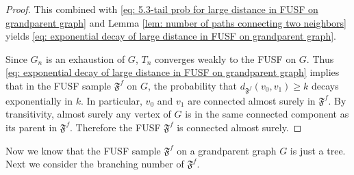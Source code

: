 \documentclass[12pt]{article}
\numberwithin{equation}{section}
\newcommand{\1}{\mathbf{1}}
\begin{document}
\begin{proof}
	This combined with \eqref{eq: 5.3-tail prob for large distance in FUSF on grandparent graph} and Lemma \ref{lem: number of paths connecting two neighbors} yields \eqref{eq: exponential decay of large distance in FUSF on grandparent graph}. 
	
	
	
	
	
	
	
	
	
	
	
	Since $G_n$ is an exhaustion of $G$, $T_n$ converges weakly to the FUSF on $G$. Thus \eqref{eq: exponential decay of large distance in FUSF on grandparent graph} implies that in the FUSF sample $\mathfrak{F}^f$ on $G$, the probability that $d_{\mathfrak{F}^f}(v_0,v_1)\geq k$ decays exponentially in $k$. In particular, $v_0$ and $v_1$ are connected almost surely in $\mathfrak{F}^f$. By transitivity, almost surely any vertex of $G$ is in the same connected component as its parent in $\mathfrak{F}^f$. Therefore the FUSF $\mathfrak{F}^f$ is connected almost surely. 
\end{proof}











Now we know that the FUSF sample $\mathfrak{F}^f$ on a grandparent graph $G$ is just a tree. Next we consider the branching number of $\mathfrak{F}^f$.
\end{document}
